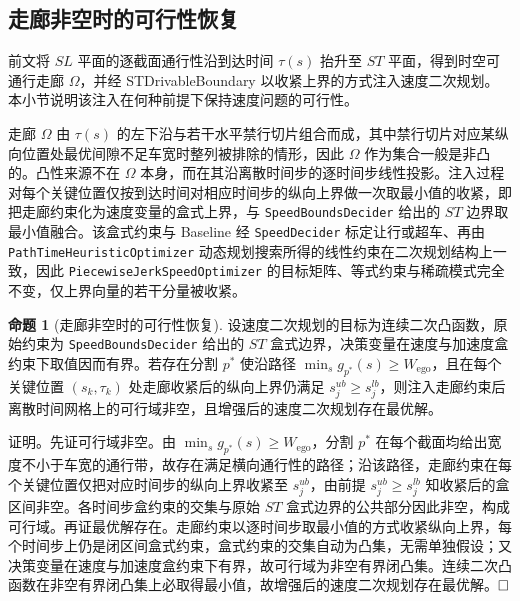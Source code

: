 \documentclass[a4paper,11pt]{ctexart}
\theoremstyle{definition}
\newtheorem{proposition}{命题}[section]
\begin{document}
\subsection{走廊非空时的可行性恢复}
\label{sec:thy_feasibility}

前文将 $SL$ 平面的逐截面通行性沿到达时间 $\tau(s)$ 抬升至 $ST$ 平面，得到时空可通行走廊 $\Omega$，并经 STDrivableBoundary 以收紧上界的方式注入速度二次规划。本小节说明该注入在何种前提下保持速度问题的可行性。

走廊 $\Omega$ 由 $\tau(s)$ 的左下沿与若干水平禁行切片组合而成，其中禁行切片对应某纵向位置处最优间隙不足车宽时整列被排除的情形，因此 $\Omega$ 作为集合一般是非凸的。凸性来源不在 $\Omega$ 本身，而在其沿离散时间步的逐时间步线性投影。注入过程对每个关键位置仅按到达时间对相应时间步的纵向上界做一次取最小值的收紧，即把走廊约束化为速度变量的盒式上界，与 \texttt{SpeedBoundsDecider} 给出的 $ST$ 边界取最小值融合。该盒式约束与 Baseline 经 \texttt{SpeedDecider} 标定让行或超车、再由 \texttt{PathTimeHeuristicOptimizer} 动态规划搜索所得的线性约束在二次规划结构上一致，因此 \texttt{PiecewiseJerkSpeedOptimizer} 的目标矩阵、等式约束与稀疏模式完全不变，仅上界向量的若干分量被收紧。

\begin{proposition}[走廊非空时的可行性恢复]
\label{prop:feasibility_recovery}
设速度二次规划的目标为连续二次凸函数，原始约束为 \texttt{SpeedBoundsDecider} 给出的 $ST$ 盒式边界，决策变量在速度与加速度盒约束下取值因而有界。若存在分割 $p^{*}$ 使沿路径 $\min_s g_{p^{*}}(s) \geq W_{\text{ego}}$，且在每个关键位置 $(s_k, \tau_k)$ 处走廊收紧后的纵向上界仍满足 $s_j^{ub} \geq s_j^{lb}$，则注入走廊约束后离散时间网格上的可行域非空，且增强后的速度二次规划存在最优解。
\end{proposition}

证明。先证可行域非空。由 $\min_s g_{p^{*}}(s) \geq W_{\text{ego}}$，分割 $p^{*}$ 在每个截面均给出宽度不小于车宽的通行带，故存在满足横向通行性的路径；沿该路径，走廊约束在每个关键位置仅把对应时间步的纵向上界收紧至 $s_j^{ub}$，由前提 $s_j^{ub} \geq s_j^{lb}$ 知收紧后的盒区间非空。各时间步盒约束的交集与原始 $ST$ 盒式边界的公共部分因此非空，构成可行域。再证最优解存在。走廊约束以逐时间步取最小值的方式收紧纵向上界，每个时间步上仍是闭区间盒式约束，盒式约束的交集自动为凸集，无需单独假设；又决策变量在速度与加速度盒约束下有界，故可行域为非空有界闭凸集。连续二次凸函数在非空有界闭凸集上必取得最小值，故增强后的速度二次规划存在最优解。$\hfill\Box$
\end{document}
